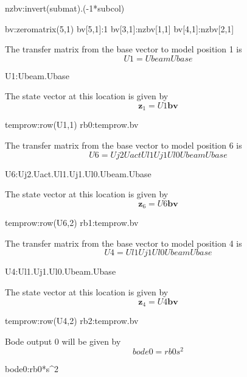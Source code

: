 \documentclass[12pt]{article}
\newcommand{\M}[1]{\mathbf{#1}}
\begin{document}
\begin{maxima-noout}
\begin{maxima-noout}
\begin{maxima-noout}
\begin{maxima-noout}
\begin{maxima-noout}
\begin{maxima-noout}
\begin{maxima-noout}
\begin{maxima-noout}
\begin{maxima-noout}
	nzbv:invert(submat).(-1*subcol)
\end{maxima-noout}
\begin{maxima-noout}
bv:zeromatrix(5,1)
bv[5,1]:1
bv[3,1]:nzbv[1,1]
bv[4,1]:nzbv[2,1]
\end{maxima-noout}
The transfer matrix from the base vector to model position 1 is
\begin{equation}
	U1=Ubeam Ubase
\end{equation}
\begin{maxima-noout}
	U1:Ubeam.Ubase
\end{maxima-noout}
The state vector at this location is given by
\begin{equation}
	\M{z}_{1}=U1 \M{bv}
\end{equation}
\begin{maxima-noout}
	temprow:row(U1,1)
	rb0:temprow.bv
\end{maxima-noout}
The transfer matrix from the base vector to model position 6 is
\begin{equation}
	U6=Uj2 Uact Ul1 Uj1 Ul0 Ubeam Ubase
\end{equation}
\begin{maxima-noout}
	U6:Uj2.Uact.Ul1.Uj1.Ul0.Ubeam.Ubase
\end{maxima-noout}
The state vector at this location is given by
\begin{equation}
	\M{z}_{6}=U6 \M{bv}
\end{equation}
\begin{maxima-noout}
	temprow:row(U6,2)
	rb1:temprow.bv
\end{maxima-noout}
The transfer matrix from the base vector to model position 4 is
\begin{equation}
	U4=Ul1 Uj1 Ul0 Ubeam Ubase
\end{equation}
\begin{maxima-noout}
	U4:Ul1.Uj1.Ul0.Ubeam.Ubase
\end{maxima-noout}
The state vector at this location is given by
\begin{equation}
	\M{z}_{4}=U4 \M{bv}
\end{equation}
\begin{maxima-noout}
	temprow:row(U4,2)
	rb2:temprow.bv
\end{maxima-noout}
Bode output 0 will be given by
\begin{equation}
	bode0=rb0 s^2
\end{equation}
\begin{maxima-noout}
bode0:rb0*s^2
\end{maxima-noout}

\end{maxima-noout}
\end{maxima-noout}
\end{maxima-noout}
\end{maxima-noout}
\end{maxima-noout}
\end{maxima-noout}
\end{maxima-noout}
\end{maxima-noout}
\end{document}
